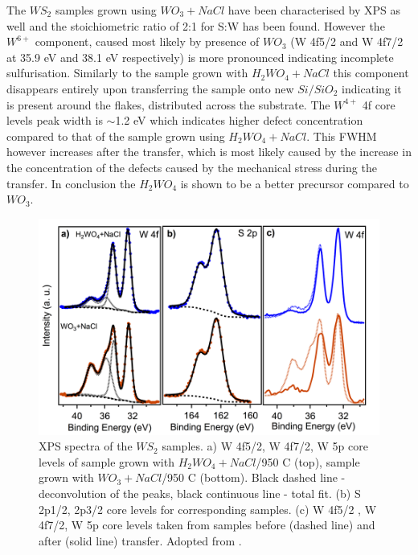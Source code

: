 The $WS_2$ samples grown using $WO_3 + NaCl$ have been characterised by XPS as well and the stoichiometric ratio of 2:1 for S:W has been found. However the $W^{6+}$ component, caused most likely by presence of $WO_3$ (W 4f5/2 and W 4f7/2 at 35.9 eV and 38.1 eV respectively) is more pronounced indicating incomplete sulfurisation. Similarly to the sample grown with $H_2WO_4 + NaCl$ this component disappears entirely upon transferring the sample onto new $Si/SiO_2$ indicating it is present around the flakes, distributed across the substrate. The $W^{4+}$ 4f core levels peak width is {$\sim$}1.2 eV which indicates higher defect concentration compared to that of the sample grown using $H_2WO_4 + NaCl$. This FWHM however increases after the transfer, which is most likely caused by the increase in the concentration of the defects caused by the mechanical stress during the transfer. In conclusion the $H_2WO_4$ is shown to be a better precursor compared to $WO_3$.
 
\begin{figure}[H]
	\begin{center}
		\includegraphics[scale=0.3]{PaperXPS.png}
		\caption{XPS spectra of the $WS_2$ samples. a) W 4f5/2, W 4f7/2, W 5p core levels of sample grown with $H_2WO_4+NaCl$/950 {\degree}C (top), sample grown with $WO_3+NaCl$/950 {\degree}C (bottom). Black dashed line - deconvolution of the peaks, black continuous line - total fit. (b) S 2p1/2, 2p3/2 core levels for corresponding samples. (c) W 4f5/2 , W 4f7/2, W 5p core levels taken from samples before (dashed line) and after (solid line) transfer. Adopted from \cite{Reale2017}.}
		\label{fig:PaperXPS}
	\end{center}
\end{figure}

